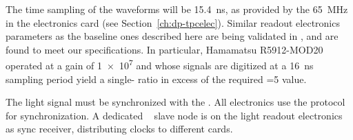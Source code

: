 The time sampling of the  waveforms will be \SI{15.4}{ns}, as provided by the \SI{65}{MHz}  in the  electronics card (see Section~\ref{ch:dp-tpcelec}). Similar readout electronics parameters as the baseline ones described here are being validated in , and are found to meet our specifications. In particular, Hamamatsu R5912-MOD20  operated at a gain of \num{1e7} and whose signals are digitized at a \SI{16}{ns} sampling period yield a single-  ratio in excess of the required =5 value.


The light signal must be synchronized with the . All  electronics use the  protocol for synchronization. A dedicated  ~\cite{utca} slave node is on the light readout  electronics as sync receiver, distributing clocks to different  cards.

